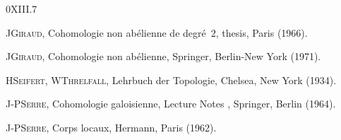 \begin{thebibliography}{0}{XIII.7}

 J\ptbl \textsc{Giraud}, Cohomologie non ab\'elienne de
degr\'e~$2$, thesis, Paris (1966).

 J\ptbl \textsc{Giraud},
Cohomologie non ab\'elienne, Springer, Berlin-New\kern2pt York (1971).

H\ptbl\textsc{Seifert}, W\ptbl\textsc{Threlfall}, Lehrbuch der Topologie, Chelsea, New
York (1934).


J-P\ptbl\textsc{Serre}, Cohomologie galoisienne, Lecture Notes
, Springer, Berlin (1964).

J-P\ptbl\textsc{Serre}, Corps locaux, Hermann, Paris (1962).
\end{thebibliography}
